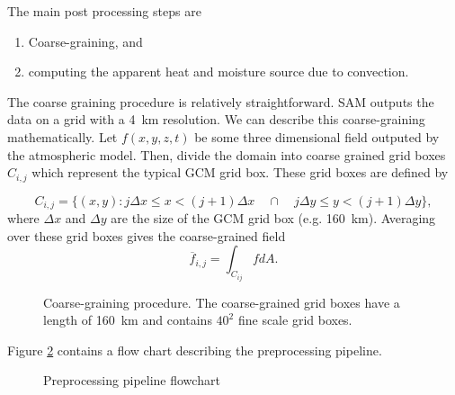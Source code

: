 \documentclass{report}
\begin{document}
The main post processing steps are

\begin{enumerate}
\item Coarse-graining, and 
\item computing the apparent heat and moisture source due to convection.
\end{enumerate}

The coarse graining procedure is relatively straightforward. 
SAM outputs the data on a grid with a \SI{4}{\km} resolution. 
We can describe this coarse-graining mathematically. 
Let $f(x,y,z,t)$ be some three dimensional field outputed by the atmospheric
model. 
Then, divide the domain into coarse grained grid boxes $C_{i,j}$ which represent the
typical GCM grid box. These grid boxes are defined by

\[
  C_{i,j} = \{(x,y):   j \Delta x \leq x < (j+1) \Delta x
  \quad \cap\quad j \Delta y \leq y < (j+1) \Delta y \},
\]
where $\Delta x$ and $\Delta y$ are the size of the GCM grid box (e.g.
\SI{160}{\km}). Averaging over these grid boxes gives the coarse-grained field
\[
  \overline{f}_{i,j} = \int_{C_{ij}} f dA.
\]

\begin{figure}
  \centering
  \caption{Coarse-graining procedure. The coarse-grained grid boxes have a
    length of \SI{160}{km} and contains $40^2$ fine scale grid boxes.}
  \label{fig:coarse-grain}
\end{figure}

Figure \ref{fig:preprocess} contains a flow chart describing the preprocessing pipeline.

\begin{figure}
  \centering
  
  \caption{Preprocessing pipeline flowchart}
  \label{fig:preprocess}
\end{figure}
\end{document}
